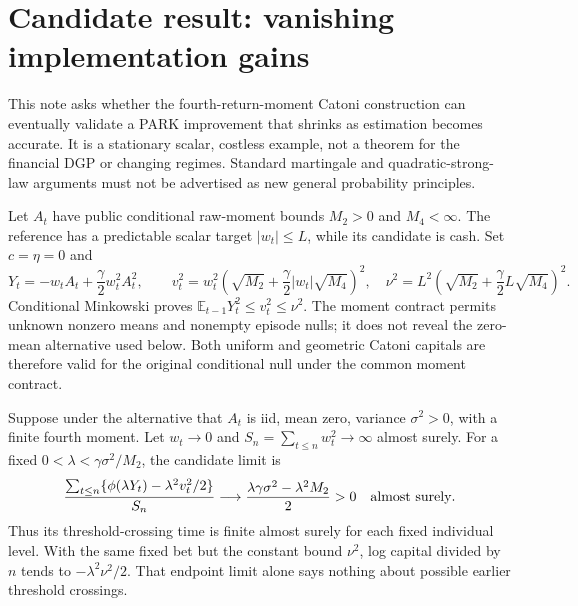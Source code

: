 
\section*{Candidate result: vanishing implementation gains}
This note asks whether the fourth-return-moment Catoni construction can
eventually validate a PARK improvement that shrinks as estimation becomes
accurate. It is a stationary scalar, costless example, not a theorem for the
financial DGP or changing regimes. Standard martingale and quadratic-strong-law
arguments must not be advertised as new general probability principles.

Let $A_t$ have public conditional raw-moment bounds $M_2>0$ and $M_4<\infty$.
The reference has a predictable scalar target $|w_t|\le L$, while its candidate
is cash. Set $c=\eta=0$ and
\[
 Y_t=-w_tA_t+\frac\gamma2w_t^2A_t^2,\qquad
 v_t^2=w_t^2\left(\sqrt{M_2}+\frac\gamma2|w_t|\sqrt{M_4}\right)^2,
 \quad \nu^2=L^2\left(\sqrt{M_2}+\frac\gamma2L\sqrt{M_4}\right)^2.
\]
Conditional Minkowski proves $\mathbb E_{t-1}Y_t^2\le v_t^2\le\nu^2$.
The moment contract permits unknown nonzero means and nonempty episode nulls;
it does not reveal the zero-mean alternative used below. Both uniform and
geometric Catoni capitals are therefore valid for the original conditional
null under the common moment contract.

Suppose under the alternative that $A_t$ is iid, mean zero, variance
$\sigma^2>0$, with a finite fourth moment. Let $w_t\to0$ and
$S_n=\sum_{t\le n}w_t^2\to\infty$ almost surely. For a fixed
$0<\lambda<\gamma\sigma^2/M_2$, the candidate limit is
\[
 \frac{\sum_{t\le n}\{\phi(\lambda Y_t)-\lambda^2v_t^2/2\}}{S_n}
 \longrightarrow \frac{\lambda\gamma\sigma^2-\lambda^2M_2}{2}>0
 \quad\hbox{almost surely}.
\]
Thus its threshold-crossing time is finite almost surely for each fixed
individual level. With the same fixed bet but the constant bound $\nu^2$,
log capital divided by $n$ tends to $-\lambda^2\nu^2/2$. That endpoint limit
alone says nothing about possible earlier threshold crossings.

